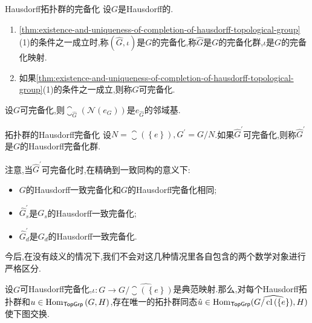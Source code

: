\begin{definition}{Hausdorff拓扑群的完备化}{}
	设$G$是Hausdorff的.
	\begin{enumerate}
		\item \cref{thm:existence-and-uniqueness-of-completion-of-hausdorff-topological-group}(1)的条件之一成立时,称$(\hat{G},\iota)$是$G$的完备化,称$\hat{G}$是$G$的完备化群,$\iota$是$G$的完备化映射.
		\item 如果\cref{thm:existence-and-uniqueness-of-completion-of-hausdorff-topological-group}(1)的条件之一成立,则称$G$可完备化.
	\end{enumerate}
\end{definition}

\begin{proposition}{}{}
	设$G$可完备化,则$\closure_{\hat{G}}\left(\mathcal{N}\left(e_{G}\right)\right)$是$e_{\hat{G}}$的邻域基.
\end{proposition}

\begin{definition}{拓扑群的Hausdorff完备化}{}
	设$N=\closure\left(\left\{e\right\}\right),G^{\prime}=G/N$.如果$\hat{G}^{\prime}$可完备化,则称$\hat{G}^{\prime}$是$G$的Hausdorff完备化群.
\end{definition}

\begin{convention}{}{}
	注意,当$\hat{G}^{\prime}$可完备化时,在精确到一致同构的意义下:
	\begin{itemize}
		\item $G$的Hausdorff一致完备化和$G$的Hausdorff完备化相同;
		\item $\hat{G}_{s}^{\prime}$是$G_{s}$的Hausdorff一致完备化;
		\item $\hat{G}_{d}^{\prime}$是$G_{d}$的Hausdorff一致完备化.
	\end{itemize}
	今后,在没有歧义的情况下,我们不会对这几种情况里各自包含的两个数学对象进行严格区分.
\end{convention}

\begin{proposition}{}{}
	设$G$可Hausdorff完备化,$\iota:G\to\widehat{G/\closure\left(\left\{e\right\}\right)}$是典范映射.那么,对每个Hausdorff拓扑群和$u\in\operatorname{Hom}_{\mathsf{TopGrp}}\left(G,H\right)$,存在唯一的拓扑群同态$\hat{u}\in\operatorname{Hom}_{\mathsf{TopGrp}}(\widehat{G/\operatorname{cl}\left(\left\{e\right\}\right)},H)$使下图交换.
	\begin{center}
	\end{center}
\end{proposition}

